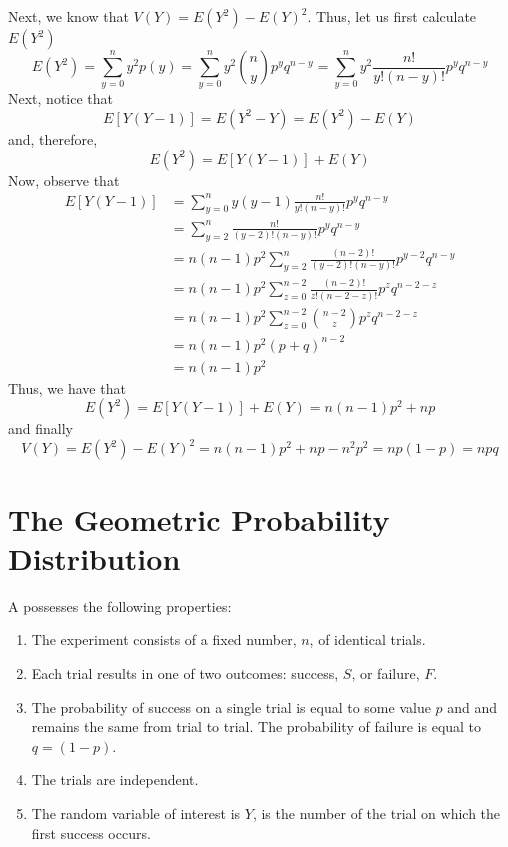\documentclass[12pt, a4paper, twoside, openright, titlepage]{book}
\begin{document}
\begin{proof*}{}{}
    Next, we know that $V(Y) = E(Y^2) - E(Y)^2$. Thus, let us first calculate $E(Y^2)$ \begin{equation*}
        E(Y^2) = \sum\limits_{y=0}^ny^2p(y) = \sum\limits_{y=0}^ny^2\binom{n}{y}p^yq^{n-y} = \sum\limits_{y=0}^ny^2\frac{n!}{y!(n-y)!}p^yq^{n-y}
    \end{equation*}
    Next, notice that \begin{equation*}
        E[Y(Y-1)] = E(Y^2-Y) = E(Y^2)-E(Y)
    \end{equation*}
    and, therefore, \begin{equation*}
        E(Y^2) = E[Y(Y-1)] + E(Y)
    \end{equation*}
    Now, observe that \begin{align*}
        E[Y(Y-1)] &= \sum\limits_{y=0}^ny(y-1)\frac{n!}{y!(n-y)!}p^yq^{n-y} \\
        &= \sum\limits_{y=2}^n\frac{n!}{(y-2)!(n-y)!}p^yq^{n-y} \\
        &= n(n-1)p^2\sum\limits_{y=2}^n\frac{(n-2)!}{(y-2)!(n-y)!}p^{y-2}q^{n-y} \\
        &= n(n-1)p^2\sum\limits_{z=0}^{n-2}\frac{(n-2)!}{z!(n-2-z)!}p^zq^{n-2-z} \\
        &= n(n-1)p^2\sum\limits_{z=0}^{n-2}\binom{n-2}{z}p^zq^{n-2-z} \\
        &= n(n-1)p^2(p+q)^{n-2} \\
        &= n(n-1)p^2
    \end{align*}
    Thus, we have that \begin{equation*}
        E(Y^2) = E[Y(Y-1)]+E(Y) = n(n-1)p^2+np
    \end{equation*}
    and finally \begin{equation*}
        V(Y) = E(Y^2)-E(Y)^2 = n(n-1)p^2+np-n^2p^2 = np(1-p) = npq
    \end{equation*}
\end{proof*}


\section{\textsection The Geometric Probability Distribution}

\begin{defn}{}{}
    A  possesses the following properties: \begin{enumerate}
        \item The experiment consists of a fixed number, $n$, of identical trials.
        \item Each trial results in one of two outcomes: success, $S$, or failure, $F$.
        \item The probability of success on a single trial is equal to some value $p$ and and remains the same from trial to trial. The probability of failure is equal to $q = (1-p)$.
        \item The trials are independent.
        \item The random variable of interest is $Y$, is the number of the trial on which the first success occurs.
    \end{enumerate}
\end{defn}
\end{document}
